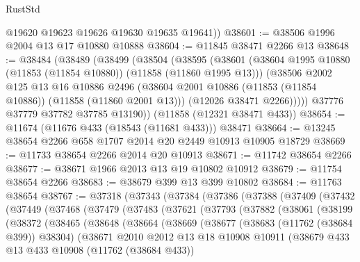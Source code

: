 \begin{lexlean}{RustStd}
\begin{coremodule}
        @19620
        @19623
        @19626
        @19630
        @19635
        @19641))
@38601 := @38506 @1996 @2004 @13 @17 @10880 @10888
@38604 := @11845 @38471 @2266 @13
@38648 := @38484
    (@38489
      (@38499
        (@38504
          (@38595
            (@38601
              (@38604 @1995 @10880 (@11853 (@11854 @10880)) (@11858 (@11860 @1995 @13)))
              (@38506
                @2002
                @125
                @13
                @16
                @10886
                @2496
                (@38604 @2001 @10886 (@11853 (@11854 @10886)) (@11858 (@11860 @2001 @13)))
                (@12026 @38471 @2266)))))
        @37776
        @37779
        @37782
        @37785
        @13190))
    (@11858 (@12321 @38471 @433))
@38654 := @11674 (@11676 @433 (@18543 (@11681 @433))) @38471
@38664 := @13245 @38654 @2266 @658 @1707 @2014 @20 @2449 @10913 @10905 @18729
@38669 := @11733 @38654 @2266 @2014 @20 @10913
@38671 := @11742 @38654 @2266
@38677 := @38671 @1966 @2013 @13 @19 @10802 @10912
@38679 := @11754 @38654 @2266
@38683 := @38679 @399 @13 @399 @10802
@38684 := @11763 @38654
@38767 := @37318
    (@37343
      (@37384
        (@37386
          (@37388
            (@37409
              (@37432
                (@37449
                  (@37468
                    (@37479
                      (@37483
                        (@37621
                          (@37793
                            (@37882
                              (@38061
                                (@38199
                                  (@38372
                                    (@38465
                                      (@38648
                                        (@38664
                                          (@38669
                                            (@38677
                                              (@38683 (@11762 (@38684 @399)) @38304)
                                              (@38671
                                                @2010
                                                @2012
                                                @13
                                                @18
                                                @10908
                                                @10911
                                                (@38679
                                                  @433
                                                  @13
                                                  @433
                                                  @10908
                                                  (@11762 (@38684 @433))

\end{coremodule}
\end{lexlean}
